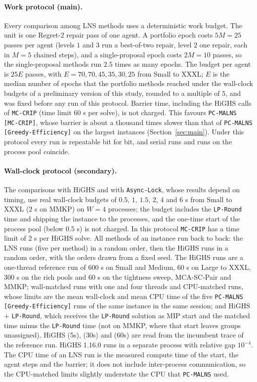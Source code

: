 \documentclass[a4paper,fleqn]{cas-sc}
\newcommand{\pcm}{\texttt{PC-MALNS}}
\newcommand{\mcc}{\texttt{MC-CRIP}}
\newcommand{\pge}{\texttt{PC-MALNS [Greedy-Efficiency]}}
\newcommand{\pmc}{\texttt{PC-MALNS [MC-CRIP]}}
\begin{document}
\paragraph{Work protocol (main).} Every comparison among LNS methods uses a deterministic work budget. The unit is one Regret-2 repair pass of one agent. A portfolio epoch costs $5M = 25$ passes per agent (levels $1$ and $3$ run a best-of-two repair, level $2$ one repair, each in $M = 5$ chained steps), and a single-proposal epoch costs $2M = 10$ passes, so the single-proposal methods run $2.5$ times as many epochs. The budget per agent is $25 E$ passes, with $E = 70, 70, 45, 35, 30, 25$ from Small to XXXL; $E$ is the median number of epochs that the portfolio methods reached under the wall-clock budgets of a preliminary version of this study, rounded to a multiple of $5$, and was fixed before any run of this protocol. Barrier time, including the HiGHS calls of \mcc{} (time limit $60$ s per solve), is not charged. This favours \pmc, whose barrier is about a thousand times slower than that of \pge{} on the largest instances (Section~\ref{sec:main}). Under this protocol every run is repeatable bit for bit, and serial runs and runs on the process pool coincide.

\paragraph{Wall-clock protocol (secondary).} The comparisons with HiGHS and with \texttt{Async-Lock}, whose results depend on timing, use real wall-clock budgets of $0.5$, $1$, $1.5$, $2$, $4$ and $6$ s from Small to XXXL ($2$ s on MMKP) on $W = 4$ processes; the budget includes the \texttt{LP-Round} time and shipping the instance to the processes, and the one-time start of the process pool (below $0.5$ s) is not charged. In this protocol \mcc{} has a time limit of $2$ s per HiGHS solve. All methods of an instance run back to back: the LNS runs (five per method) in a random order, then the HiGHS runs in a random order, with the orders drawn from a fixed seed. The HiGHS runs are a one-thread reference run of $600$ s on Small and Medium, $60$ s on Large to XXXL, $300$ s on the rich pools and $60$ s on the tightness sweep, MCA-SC-Pair and MMKP; wall-matched runs with one and four threads and CPU-matched runs, whose limits are the mean wall-clock and mean CPU time of the five \pge{} runs of the same instance in the same session; and HiGHS + \texttt{LP-Round}, which receives the \texttt{LP-Round} solution as MIP start and the matched time minus the \texttt{LP-Round} time (not on MMKP, where that start leaves groups unassigned). HiGHS (5s), (30s) and (60s) are read from the incumbent trace of the reference run. HiGHS 1.16.0 runs in a separate process with relative gap $10^{-4}$. The CPU time of an LNS run is the measured compute time of the start, the agent steps and the barrier; it does not include inter-process communication, so the CPU-matched limits slightly understate the CPU that \pcm{} used.
\end{document}

